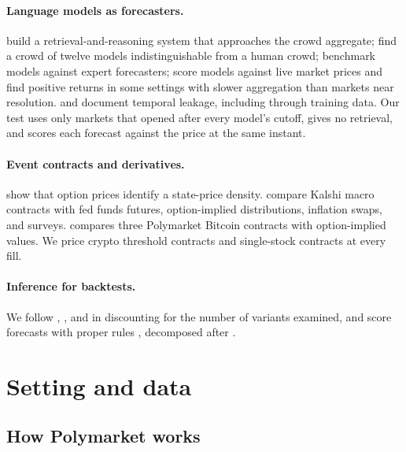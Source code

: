 \documentclass[format=acmsmall, review=false]{acmart}
\begin{document}
\paragraph{Language models as forecasters.} \citet{halawi2024approaching} build a retrieval-and-reasoning system that approaches the crowd aggregate; \citet{schoenegger2024wisdom} find a crowd of twelve models indistinguishable from a human crowd; \citet{karger2025forecastbench} benchmark models against expert forecasters; \citet{yang2026prophet} score models against live market prices and find positive returns in some settings with slower aggregation than markets near resolution. \citet{paleka2026pitfalls} and \citet{lopezlira2025memorization} document temporal leakage, including through training data. Our test uses only markets that opened after every model's cutoff, gives no retrieval, and scores each forecast against the price at the same instant.

\paragraph{Event contracts and derivatives.} \citet{breeden1978prices} show that option prices identify a state-price density. \citet{diercks2026kalshi} compare Kalshi macro contracts with fed funds futures, option-implied distributions, inflation swaps, and surveys. \citet{portnaya2026prediction} compares three Polymarket Bitcoin contracts with option-implied values. We price \thrMarkets{} crypto threshold contracts and \stockMarkets{} single-stock contracts at every fill.

\paragraph{Inference for backtests.} We follow \citet{bailey2014deflated}, \citet{harvey2016cross}, and \citet{white2000reality} in discounting for the number of variants examined, and score forecasts with proper rules \citep{brier1950verification,gneiting2007strictly}, decomposed after \citet{murphy1973new}.

\section{Setting and data}\label{sec:data}

\subsection{How Polymarket works}
\end{document}
